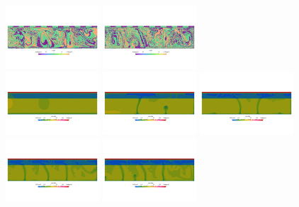 \begin{center}
\includegraphics[width=3.5cm]{python_codes/fieldstone_88/results/model2/m0014.png}
\includegraphics[width=3.5cm]{python_codes/fieldstone_88/results/model2/m0019.png}\\
\includegraphics[width=3.5cm]{python_codes/fieldstone_88/results/model2/v0000.png}
\includegraphics[width=3.5cm]{python_codes/fieldstone_88/results/model2/v0004.png}
\includegraphics[width=3.5cm]{python_codes/fieldstone_88/results/model2/v0009.png}
\includegraphics[width=3.5cm]{python_codes/fieldstone_88/results/model2/v0014.png}
\includegraphics[width=3.5cm]{python_codes/fieldstone_88/results/model2/v0019.png}\\

\end{center}
